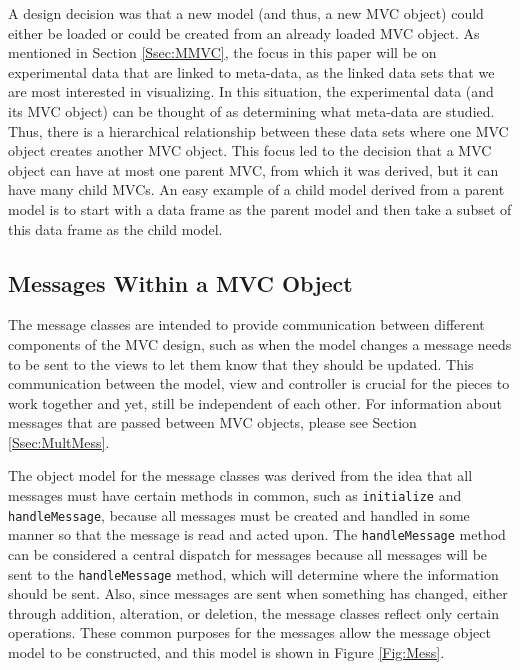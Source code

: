 \documentclass{article}[11pt]
\newcommand{\Rfunction}[1]{{\texttt{#1}}}
\begin{document}
A design decision was that a new model (and thus, a new MVC object) could
either be loaded or could be created from an already loaded MVC object.  As
mentioned in Section \ref{Ssec:MMVC}, the focus in this paper will be on
experimental data that are linked to meta-data, as the linked data sets that we
are most interested in visualizing.  In this situation, the experimental data
(and its MVC object) can be thought of as determining what meta-data are
studied.  Thus, there is a hierarchical relationship between these data sets
where one MVC object creates another MVC object.  This focus led to the
decision that a MVC object can have at most one parent MVC, from which it was
derived, but it can have many child MVCs.  An easy example of a child model
derived from a parent model is to start with a data frame as the parent model
and then take a subset of this data frame as the child model.  

\subsection{Messages Within a MVC Object}\label{Ssec:OneMess}

The message classes are intended to provide communication between different
components of the MVC design, such as when the model changes a message needs to
be sent to the views to let them know that they should be updated.  This
communication between the model, view and controller is crucial for the pieces
to work together and yet, still be independent of each other.  For information
about messages that are passed between MVC objects, please see Section
\ref{Ssec:MultMess}.

The object model for the message classes was derived from the idea that all
messages must have certain methods in common, such as \Rfunction{initialize}
and \Rfunction{handleMessage}, because all messages must be created and
handled in some manner so that the message is read and acted upon.  The
\Rfunction{handleMessage} method can be considered a central dispatch for
messages because all messages will be sent to the \Rfunction{handleMessage}
method, which will determine where the information should be sent.   Also,
since messages are sent when something has changed, either through addition,
alteration, or deletion, the message classes reflect only certain operations.
These common purposes for the messages allow the message object model to be
constructed, and this model is shown in Figure \ref{Fig:Mess}.
\end{document}
